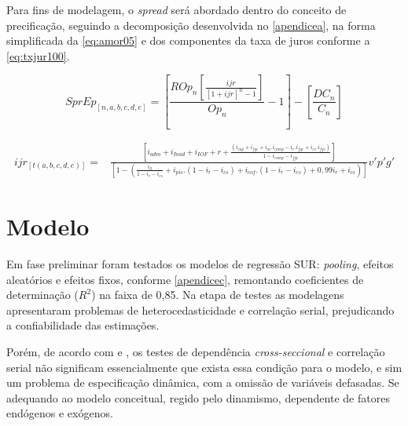 \documentclass[
  12pt,
  12pt,
  openright,
  oneside,
  a4paper,
  chapter=TITLE,
  section=TITLE,
  subsection=TITLE,
  subsubsection=TITLE,
  english,
  portugues,
  sumario=tradicional]{abntex2}
\begin{document}
Para fins de modelagem, o \emph{spread} será abordado dentro do conceito de precificação, seguindo a decomposição desenvolvida no \autoref{apendicea}, na forma simplificada da \autoref{eq:amor05} e dos componentes da taxa de juros conforme a \autoref{eq:txjur100}.

\begin{equation}\label{eq:amor100}
SprEp_{[n,a,b,c,d,e]} = \left[ \frac{ROp_{n}[\frac{   ijr_{}  }{  [1 + ijr_{}]^n -1  }]}{Op_{n}} -1 \right] - \left[ \frac{DC_{n}}{C_{n}} \right]
\end{equation}

\begin{equation}\label{eq:txjur100}
\begin{aligned}
ijr_{[t(a,b,c,d,e)]} = & \frac{[i_{adm} + i_{Inad} + i_{IOF} + r +  \frac{(i_{cap} + i_{fgc} + i_{ac}.i_{comp} - i_{r}.i_{fgc}+ i_{cs}.i_{fgc})}{1 - i_{comp} - i_{fgc}}]}
{[1 - (\frac{i_{ll}}{1 - i_{r} - i_{cs}} + i_{pis}.(1 - i_{r} - i_{cs}) + i_{cof}.(1 - i_{r} - i_{cs}) + 0,99i_{r} + i_{cs})]}v'p'g'
\end{aligned}
\end{equation}

\section{Modelo}

Em fase preliminar foram testados os modelos de regressão SUR: \emph{pooling}, efeitos aleatórios e efeitos fixos, conforme \autoref{apendicec}, remontando coeficientes de determinação (\(R^2\)) na faixa de 0,85. Na etapa de testes as modelagens apresentaram problemas de heterocedasticidade e correlação serial, prejudicando a confiabilidade das estimações.

Porém, de acordo com \textcite{sargan:1964} e \textcite{hendry:1978}, os testes de dependência \emph{cross-seccional} e correlação serial não significam essencialmente que exista essa condição para o modelo, e sim um problema de especificação dinâmica, com a omissão de variáveis defasadas. Se adequando ao modelo conceitual, regido pelo dinamismo, dependente de fatores endógenos e exógenos.
\end{document}
